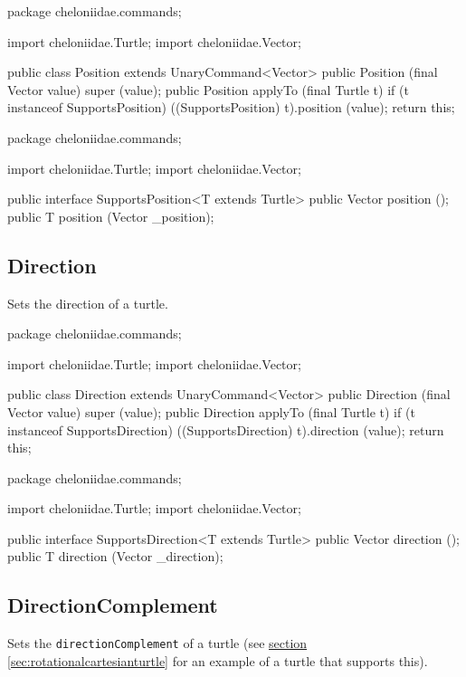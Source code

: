 \documentclass{report}
\newcommand{\Ref}[2]{\hyperref[#2]{#1 \ref*{#2}}}
\begin{document}
\begin{javacode}
package cheloniidae.commands;

import cheloniidae.Turtle;
import cheloniidae.Vector;

public class Position extends UnaryCommand<Vector> {
  public Position (final Vector value) {super (value);}
  public Position applyTo (final Turtle t) {
    if (t instanceof SupportsPosition) ((SupportsPosition) t).position (value);
    return this;
  }
}
\end{javacode}

\begin{javacode}
package cheloniidae.commands;

import cheloniidae.Turtle;
import cheloniidae.Vector;

public interface SupportsPosition<T extends Turtle> {
  public Vector position ();
  public T      position (Vector _position);
}
\end{javacode}

\subsection {Direction} \label{sec:direction}
        Sets the direction of a turtle.

\begin{javacode}
package cheloniidae.commands;

import cheloniidae.Turtle;
import cheloniidae.Vector;

public class Direction extends UnaryCommand<Vector> {
  public Direction (final Vector value) {super (value);}
  public Direction applyTo (final Turtle t) {
    if (t instanceof SupportsDirection) ((SupportsDirection) t).direction (value);
    return this;
  }
}
\end{javacode}

\begin{javacode}
package cheloniidae.commands;

import cheloniidae.Turtle;
import cheloniidae.Vector;

public interface SupportsDirection<T extends Turtle> {
  public Vector direction ();
  public T      direction (Vector _direction);
}
\end{javacode}

\subsection {DirectionComplement} \label{sec:directioncomplement}
        Sets the {\tt directionComplement} of a turtle (see \Ref{section}{sec:rotationalcartesianturtle} for an example of a turtle that supports this).
\end{document}
